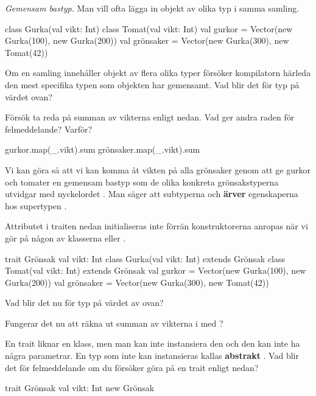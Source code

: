 \BasicTasks %


\Task \emph{Gemensam bastyp.} Man vill ofta lägga in objekt av olika typ i samma samling.
\begin{REPL}
class Gurka(val vikt: Int)
class Tomat(val vikt: Int)
val gurkor = Vector(new Gurka(100), new Gurka(200))
val grönsaker = Vector(new Gurka(300), new Tomat(42))
\end{REPL}
\Subtask Om en samling innehåller objekt av flera olika typer försöker kompilatorn härleda den mest specifika typen som objekten har gemensamt. Vad blir det för typ på värdet  ovan?

\Subtask Försök ta reda på summan av vikterna enligt nedan. Vad ger andra raden för felmeddelande? Varför?

\begin{REPL}
gurkor.map(_.vikt).sum
grönsaker.map(_.vikt).sum
\end{REPL}

\Subtask Vi kan göra så att vi kan komma åt vikten på alla grönsaker genom att ge gurkor och tomater en gemensam bastyp som de olika konkreta grönsakstyperna utvidgar med nyckelordet . Man säger att subtyperna  och  \textbf{ärver} egenskaperna hos supertypen . 

Attributet  i traiten  nedan initialiseras inte förrän konstruktorerna anropas när vi gör  på någon av klasserna  eller . 

\begin{REPL}
trait Grönsak { val vikt: Int } 
class Gurka(val vikt: Int) extends Grönsak
class Tomat(val vikt: Int) extends Grönsak
val gurkor = Vector(new Gurka(100), new Gurka(200))
val grönsaker = Vector(new Gurka(300), new Tomat(42))
\end{REPL}

\Subtask Vad blir det nu för typ på värdet av  ovan? 

\Subtask Fungerar det nu att räkna ut summan av vikterna i  med ?


\Subtask En trait liknar en klass, men man kan inte instansiera den och den kan inte ha några parametrar. En typ som inte kan instansieras kallas \textbf{abstrakt} . Vad blir det för felmeddelande om du försöker göra  på en trait enligt nedan?
\begin{REPL}
trait Grönsak{ val vikt: Int } 
new Grönsak
\end{REPL}



